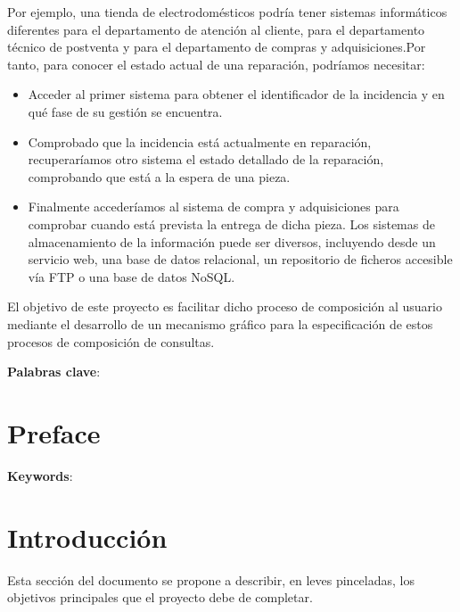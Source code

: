 \documentclass[a4paper,12pt]{article}
\begin{document}
	Por ejemplo, una tienda de electrodomésticos podría tener sistemas informáticos diferentes para el departamento de atención al cliente, para el departamento técnico de postventa y para el departamento de compras y adquisiciones.Por tanto, para conocer el estado actual de una reparación, podríamos necesitar:
		\begin{itemize}
			\item  Acceder al primer sistema para obtener el identificador de la incidencia y en qué fase de su gestión se encuentra.
			\item  Comprobado que la incidencia está actualmente en reparación, recuperaríamos otro sistema el estado detallado de la reparación, comprobando que está a la espera de una pieza.
			\item Finalmente accederíamos al sistema de compra y adquisiciones para comprobar cuando está prevista la entrega de dicha pieza. Los sistemas de almacenamiento de la información puede ser diversos, incluyendo desde un servicio web, una base de datos relacional, un repositorio de ficheros accesible vía FTP o una base de datos NoSQL.
		\end{itemize}
	
	\vspace{5mm}
	
	El objetivo de este proyecto es facilitar dicho proceso de composición al usuario mediante el desarrollo de un mecanismo gráfico para la especificación de estos procesos de composición de consultas.
	

	\vspace{5mm}
	
	\textbf{Palabras clave}: 
	\cleardoublepage
	
	\afterpage{\null\newpage}
	\newpage
	
	\section*{Preface}

	

	\textbf{Keywords}:
	\cleardoublepage
	
	\setcounter{page}{1}
	
	\afterpage{\null\newpage}
	\newpage
	
	\section{Introducción}
	
	Esta sección del documento se propone a describir, en leves pinceladas, los objetivos principales que el proyecto debe de completar.
	
\end{document}
